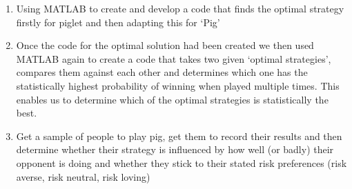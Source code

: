 \documentclass[a4paper,titlepage]{article}
\begin{document}
\begin{enumerate}
\item Using MATLAB to create and develop a code that finds the optimal strategy firstly for piglet and then adapting this for ‘Pig’

\item Once the code for the optimal solution had been created we then used MATLAB again to create a code that takes two given ‘optimal strategies’, compares them against each other and determines which one has the statistically highest probability of winning when played multiple times. This enables us to determine which of the optimal strategies is statistically the best.

\item Get a sample of people to play pig, get them to record their results and then determine whether their strategy is influenced by how well (or badly) their opponent is doing and whether they stick to their stated risk preferences (risk averse, risk neutral, risk loving)
\end{enumerate}
\end{document}
